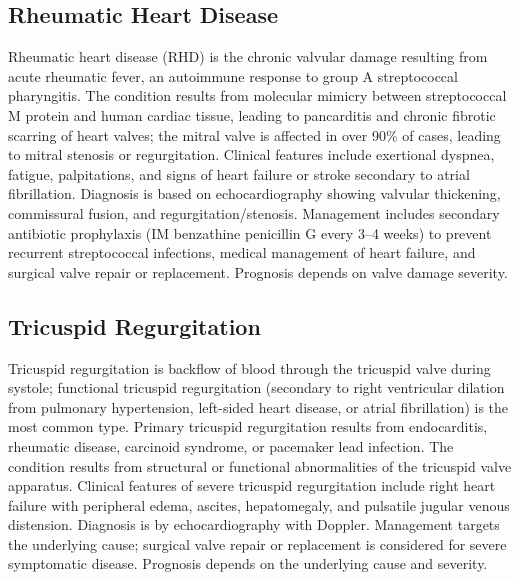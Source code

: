 \subsection{Rheumatic Heart Disease}
\label{sec:Rheumatic Heart Disease}
Rheumatic heart disease (RHD) is the chronic valvular damage resulting from acute rheumatic fever, an autoimmune response to group A streptococcal pharyngitis. The condition results from molecular mimicry between streptococcal M protein and human cardiac tissue, leading to pancarditis and chronic fibrotic scarring of heart valves; the mitral valve is affected in over 90\% of cases, leading to mitral stenosis or regurgitation. Clinical features include exertional dyspnea, fatigue, palpitations, and signs of heart failure or stroke secondary to atrial fibrillation. Diagnosis is based on echocardiography showing valvular thickening, commissural fusion, and regurgitation/stenosis. Management includes secondary antibiotic prophylaxis (IM benzathine penicillin G every 3--4 weeks) to prevent recurrent streptococcal infections, medical management of heart failure, and surgical valve repair or replacement. Prognosis depends on valve damage severity.

\subsection{Tricuspid Regurgitation}
\label{sec:Tricuspid Regurgitation}
Tricuspid regurgitation is backflow of blood through the tricuspid valve during systole; functional tricuspid regurgitation (secondary to right ventricular dilation from pulmonary hypertension, left-sided heart disease, or atrial fibrillation) is the most common type. Primary tricuspid regurgitation results from endocarditis, rheumatic disease, carcinoid syndrome, or pacemaker lead infection. The condition results from structural or functional abnormalities of the tricuspid valve apparatus. Clinical features of severe tricuspid regurgitation include right heart failure with peripheral edema, ascites, hepatomegaly, and pulsatile jugular venous distension. Diagnosis is by echocardiography with Doppler. Management targets the underlying cause; surgical valve repair or replacement is considered for severe symptomatic disease. Prognosis depends on the underlying cause and severity.

